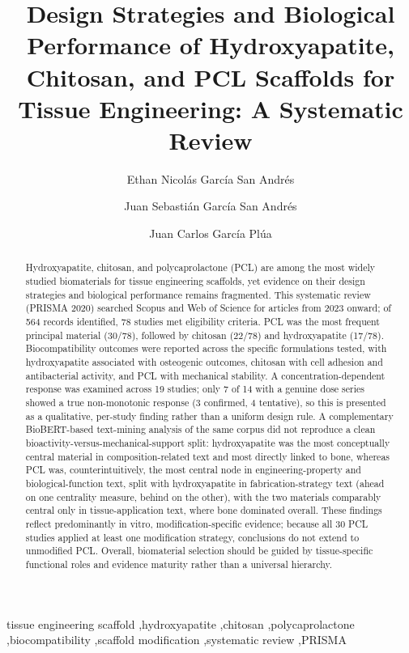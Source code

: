\documentclass[5p,times,twocolumn]{elsarticle}
\begin{document}
\begin{frontmatter}

\title{Design Strategies and Biological Performance of Hydroxyapatite, Chitosan, and PCL Scaffolds for Tissue Engineering: A Systematic Review}

\author[label1]{Ethan Nicolás García San Andrés}
\author[label2]{Juan Sebastián García San Andrés}
\author[label3]{Juan Carlos García Plúa}

\address[label1]{Universidad Politécnica Salesiana, Guayaquil, Ecuador}
\address[label2]{Alexandria Technical and Community College, Alexandria, Minnesota, United States}
\address[label3]{Universidad de Guayaquil, Guayaquil, Ecuador}

\begin{abstract}
Hydroxyapatite, chitosan, and polycaprolactone (PCL) are among the most widely studied biomaterials for tissue engineering scaffolds, yet evidence on their design strategies and biological performance remains fragmented. This systematic review (PRISMA 2020) searched Scopus and Web of Science for articles from 2023 onward; of 564 records identified, 78 studies met eligibility criteria. PCL was the most frequent principal material (30/78), followed by chitosan (22/78) and hydroxyapatite (17/78). Biocompatibility outcomes were reported across the specific formulations tested, with hydroxyapatite associated with osteogenic outcomes, chitosan with cell adhesion and antibacterial activity, and PCL with mechanical stability. A concentration-dependent response was examined across 19 studies; only 7 of 14 with a genuine dose series showed a true non-monotonic response (3 confirmed, 4 tentative), so this is presented as a qualitative, per-study finding rather than a uniform design rule. A complementary BioBERT-based text-mining analysis of the same corpus did not reproduce a clean bioactivity-versus-mechanical-support split: hydroxyapatite was the most conceptually central material in composition-related text and most directly linked to bone, whereas PCL was, counterintuitively, the most central node in engineering-property and biological-function text, split with hydroxyapatite in fabrication-strategy text (ahead on one centrality measure, behind on the other), with the two materials comparably central only in tissue-application text, where bone dominated overall. These findings reflect predominantly in vitro, modification-specific evidence; because all 30 PCL studies applied at least one modification strategy, conclusions do not extend to unmodified PCL. Overall, biomaterial selection should be guided by tissue-specific functional roles and evidence maturity rather than a universal hierarchy.
\end{abstract}

\begin{keyword}
tissue engineering scaffold \sep hydroxyapatite \sep chitosan \sep polycaprolactone \sep biocompatibility \sep scaffold modification \sep systematic review \sep PRISMA
\end{keyword}

\end{frontmatter}
\end{document}
